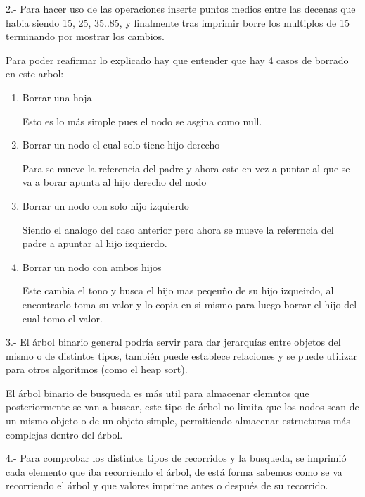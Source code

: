 \begin{respuesta}{2.-}
    Para hacer uso de las operaciones inserte puntos medios entre las decenas que habia siendo 15, 25, 35..85, y finalmente tras imprimir borre los multiplos de 15 terminando por mostrar los cambios.

    Para poder reafirmar lo explicado hay que entender que hay 4 casos de borrado en este arbol:
    \begin{enumerate}
        \item Borrar una hoja

        Esto es lo más simple pues el nodo se asgina como null.
        \item Borrar un nodo el cual solo tiene hijo derecho

        Para se mueve la referencia del padre y ahora este en vez a puntar al que se va a borar apunta al hijo derecho del nodo
        \item Borrar un nodo con solo hijo izquierdo

        Siendo el analogo del caso anterior pero ahora se mueve la referrncia del padre a apuntar al hijo izquierdo.
        \item Borrar un nodo con ambos hijos

        Este cambia el tono y busca el hijo mas peqeuño de su hijo izqueirdo, al encontrarlo toma su valor y lo copia en si mismo para luego borrar el hijo del cual tomo el valor.
    \end{enumerate}
\end{respuesta}
\begin{respuesta}{3.-}
    El árbol binario general podría servir para dar jerarquías entre objetos del mismo o de distintos tipos, también puede establece relaciones y se puede utilizar para otros algoritmos (como el heap sort).
    
    El árbol binario de busqueda es más util para almacenar elemntos que posteriormente se van a buscar, este tipo de árbol no limita que los nodos sean de un mismo objeto o de un objeto simple, permitiendo almacenar estructuras más complejas dentro del árbol. 
\end{respuesta}
\begin{respuesta}{4.-}
    Para comprobar los distintos tipos de recorridos y la busqueda, se imprimió cada elemento que iba recorriendo el árbol, de está forma sabemos como se va recorriendo el árbol y que valores imprime antes o después de su recorrido.

\end{respuesta}

